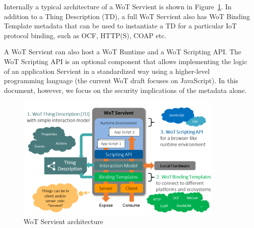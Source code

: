 Internally a typical architecture of a WoT Servient is shown in Figure~\ref{fig-fservient}. 
In addition to a Thing Description (TD), a full WoT Servient also has WoT Binding Template 
metadata that can be used to instantiate a TD for a particular IoT protocol binding, 
such as OCF, HTTP(S), COAP etc. 

A WoT Servient can also host a WoT Runtime and a WoT Scripting API.
The WoT Scripting API is an optional component that allows 
implementing the logic of an application Servient in a standardized way
using a higher-level programming language (the current WoT draft focuses on JavaScript). 
In this document, however, we focus on the security implications of the metadata alone.

\begin{figure}[!t]
\centering
\includegraphics[width=4in]{figures/wot-servient.png}
\caption{WoT Servient architecture}
\label{fig-fservient}
\end{figure}


